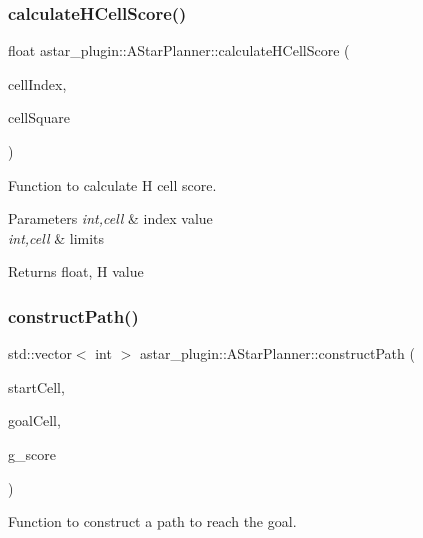 \subsubsection{\texorpdfstring{calculate\+H\+Cell\+Score()}{calculateHCellScore()}}
{\footnotesize\ttfamily float astar\+\_\+plugin\+::\+A\+Star\+Planner\+::calculate\+H\+Cell\+Score (\begin{DoxyParamCaption}\item[{int}]{cell\+Index,  }\item[{int}]{cell\+Square }\end{DoxyParamCaption})}



Function to calculate H cell score. 


\begin{DoxyParams}{Parameters}
{\em int,cell} & index value \\
\hline
{\em int,cell} & limits \\
\hline
\end{DoxyParams}
\begin{DoxyReturn}{Returns}
float, H value 
\end{DoxyReturn}
\mbox{\label{classastar__plugin_1_1_a_star_planner_aae75ccdcf38f6cd848d024a8aebc0bc0}} 
\subsubsection{\texorpdfstring{construct\+Path()}{constructPath()}}
{\footnotesize\ttfamily std\+::vector$<$ int $>$ astar\+\_\+plugin\+::\+A\+Star\+Planner\+::construct\+Path (\begin{DoxyParamCaption}\item[{int}]{start\+Cell,  }\item[{int}]{goal\+Cell,  }\item[{std\+::vector$<$ float $>$}]{g\+\_\+score }\end{DoxyParamCaption})}



Function to construct a path to reach the goal. 


